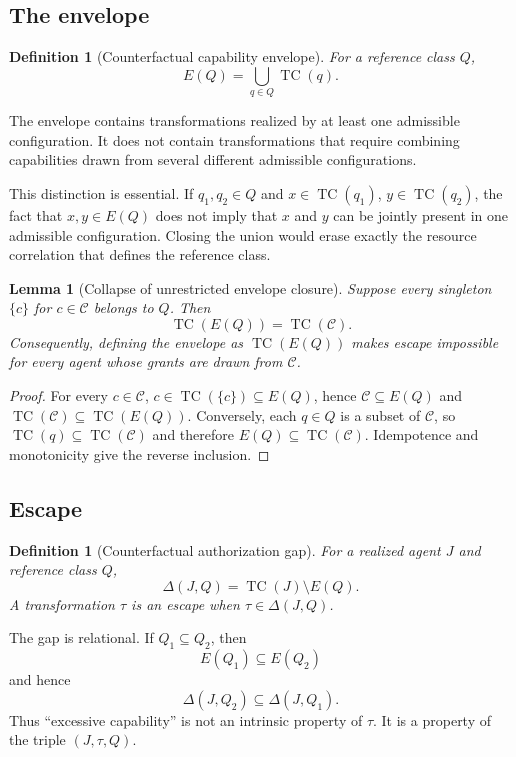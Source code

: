 \documentclass[11pt]{article}
\newtheorem{lemma}[theorem]{Lemma}
\newtheorem{definition}[theorem]{Definition}
\newcommand{\TC}{\operatorname{TC}}
\newcommand{\Cset}{\mathcal C}
\begin{document}
\subsection{The envelope}

\begin{definition}[Counterfactual capability envelope]
For a reference class $Q$,
\[
E(Q)=\bigcup_{q\in Q}\TC(q).
\]
\end{definition}

The envelope contains transformations realized by at least one admissible configuration. It does not contain transformations that require combining capabilities drawn from several different admissible configurations.

This distinction is essential. If $q_1,q_2\in Q$ and $x\in\TC(q_1)$, $y\in\TC(q_2)$, the fact that $x,y\in E(Q)$ does not imply that $x$ and $y$ can be jointly present in one admissible configuration. Closing the union would erase exactly the resource correlation that defines the reference class.

\begin{lemma}[Collapse of unrestricted envelope closure]
Suppose every singleton $\{c\}$ for $c\in\Cset$ belongs to $Q$. Then
\[
\TC(E(Q))=\TC(\Cset).
\]
Consequently, defining the envelope as $\TC(E(Q))$ makes escape impossible for every agent whose grants are drawn from $\Cset$.
\end{lemma}

\begin{proof}
For every $c\in\Cset$, $c\in\TC(\{c\})\subseteq E(Q)$, hence $\Cset\subseteq E(Q)$ and $\TC(\Cset)\subseteq\TC(E(Q))$. Conversely, each $q\in Q$ is a subset of $\Cset$, so $\TC(q)\subseteq\TC(\Cset)$ and therefore $E(Q)\subseteq\TC(\Cset)$. Idempotence and monotonicity give the reverse inclusion.
\end{proof}

\subsection{Escape}

\begin{definition}[Counterfactual authorization gap]
For a realized agent $J$ and reference class $Q$,
\[
\boxed{\Delta(J,Q)=\TC(J)\setminus E(Q).}
\]
A transformation $\tau$ is an escape when $\tau\in\Delta(J,Q)$.
\end{definition}

The gap is relational. If $Q_1\subseteq Q_2$, then
\[
E(Q_1)\subseteq E(Q_2)
\]
and hence
\[
\Delta(J,Q_2)\subseteq\Delta(J,Q_1).
\]
Thus ``excessive capability'' is not an intrinsic property of $\tau$. It is a property of the triple $(J,\tau,Q)$.
\end{document}
